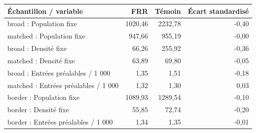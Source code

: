 \begin{tabularx}{\linewidth}{Xrrr}
\toprule
Échantillon / variable & FRR & Témoin & Écart standardisé \\
\midrule
broad : Population fixe & 1020,46 & 2232,78 & -0,40 \\
matched : Population fixe & 947,66 & 955,19 & -0,00 \\
broad : Densité fixe & 66,26 & 255,92 & -0,36 \\
matched : Densité fixe & 63,89 & 69,80 & -0,05 \\
broad : Entrées préalables / 1 000 & 1,35 & 1,51 & -0,18 \\
matched : Entrées préalables / 1 000 & 1,32 & 1,30 & 0,03 \\
border : Population fixe & 1089,93 & 1289,54 & -0,10 \\
border : Densité fixe & 55,85 & 72,74 & -0,20 \\
border : Entrées préalables / 1 000 & 1,34 & 1,35 & -0,01 \\
\bottomrule
\end{tabularx}
